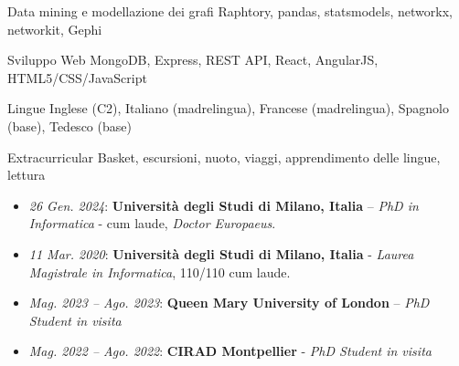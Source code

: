 \documentclass[11pt, a4paper]{awesome-cv}
\begin{document}
\begin{refsection}
\begin{cvskills}
  \cvskill
    {Data mining e modellazione dei grafi} %
    {Raphtory, pandas, statsmodels, networkx, networkit, Gephi} %

  \cvskill
    {Sviluppo Web} %
    {MongoDB, Express, REST API, React, AngularJS, HTML5/CSS/JavaScript} %


  \cvskill
    {Lingue} %
    {Inglese (C2), Italiano (madrelingua), Francese (madrelingua), Spagnolo (base), Tedesco (base)} %
    
    \cvskill
    {Extracurricular} %
    {Basket, escursioni, nuoto, viaggi, apprendimento delle lingue, lettura}
\end{cvskills}


\begin{itemize}
\item \textit{26 Gen. 2024}: \textbf{Università degli Studi di Milano, Italia} – \textit{PhD in Informatica} - cum laude, \textit{Doctor Europaeus}.


    \item \textit{11 Mar. 2020}: \textbf{Università degli Studi di Milano, Italia} - \textit{Laurea Magistrale in Informatica}, 110/110 cum laude.
\end{itemize}

\begin{itemize}
    \item \textit{Mag. 2023 – Ago. 2023}: \textbf{Queen Mary University of London} – \textit{PhD Student in visita}

    \item \textit{Mag. 2022 – Ago. 2022}: \textbf{CIRAD Montpellier} - \textit{PhD Student in visita}
\end{itemize}







\end{refsection}
\end{document}

